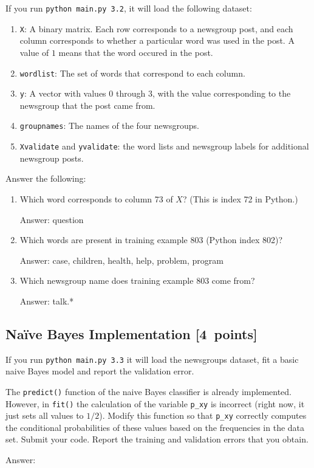\documentclass{article}
\newcommand{\blu}[1]{{\textcolor{blu}{#1}}}
\newenvironment{answer}{\par\begingroup\color{gre}Answer: }{\endgroup}
\let\ask\blu
\newcommand\pts[1]{\textcolor{pointscolour}{[#1~points]}}
\begin{document}
    If you run \texttt{python main.py 3.2}, it will load the following dataset:
    \begin{enumerate}
        \item \texttt{X}: A binary matrix. Each row corresponds to a newsgroup post, and each column corresponds to whether a particular word was used in the post. A value of $1$ means that the word occured in the post.
        \item \texttt{wordlist}: The set of words that correspond to each column.
        \item \texttt{y}: A vector with values $0$ through $3$, with the value corresponding to the newsgroup that the post came from.
        \item \texttt{groupnames}: The names of the four newsgroups.
        \item \texttt{Xvalidate} and \texttt{yvalidate}: the word lists and newsgroup labels for additional newsgroup posts.
    \end{enumerate}
    \ask{Answer the following}:
    \begin{enumerate}
        \item Which word corresponds to column 73 of $X$? (This is index 72 in Python.)
        \begin{answer}
        question
        \end{answer}
        \item Which words are present in training example 803 (Python index 802)?
        \begin{answer}
        case, children, health, help, problem, program
        \end{answer}
        \item Which newsgroup name does training example 803 come from?
        \begin{answer}
        talk.*
        \end{answer}
    \end{enumerate}

    \clearpage
    \subsection{Na\"ive Bayes Implementation \pts{4}}

    If you run \texttt{python main.py 3.3}
    it will load the newsgroups dataset, fit a basic naive Bayes model and report the validation error.

    The \texttt{predict()} function of the naive Bayes classifier is already implemented.
    However, in \texttt{fit()}
    the calculation of the variable \texttt{p\_xy} is incorrect
    (right now, it just sets all values to $1/2$).
    \ask{Modify this function so that \texttt{p\_xy} correctly
        computes the conditional probabilities of these values based on the
        frequencies in the data set. Submit your code. Report the training and validation errors that you obtain.}
    \begin{answer}

    \end{answer}
    \clearpage
\end{document}
